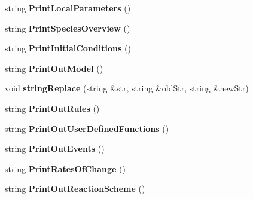 \begin{DoxyCompactItemize}
\item 
\hypertarget{class_matlab_translator_a98f05c4ab394f20d091b35fd7d50cbf0}{string {\bfseries Print\-Local\-Parameters} ()}\label{class_matlab_translator_a98f05c4ab394f20d091b35fd7d50cbf0}

\item 
\hypertarget{class_matlab_translator_a79171b460eefd53ed341f68e376ca261}{string {\bfseries Print\-Species\-Overview} ()}\label{class_matlab_translator_a79171b460eefd53ed341f68e376ca261}

\item 
\hypertarget{class_matlab_translator_ab5db791638a4189ae60f572b7da6cf1d}{string {\bfseries Print\-Initial\-Conditions} ()}\label{class_matlab_translator_ab5db791638a4189ae60f572b7da6cf1d}

\item 
\hypertarget{class_matlab_translator_ad2ef370634359e895aa3b1640a61ac9b}{string {\bfseries Print\-Out\-Model} ()}\label{class_matlab_translator_ad2ef370634359e895aa3b1640a61ac9b}

\item 
\hypertarget{class_matlab_translator_a7ed4fdf19fade3182a09209be4528ac4}{void {\bfseries string\-Replace} (string \&str, string \&old\-Str, string \&new\-Str)}\label{class_matlab_translator_a7ed4fdf19fade3182a09209be4528ac4}

\item 
\hypertarget{class_matlab_translator_a8dcc4de45d0a918816ec6a140673bed6}{string {\bfseries Print\-Out\-Rules} ()}\label{class_matlab_translator_a8dcc4de45d0a918816ec6a140673bed6}

\item 
\hypertarget{class_matlab_translator_a29aaa503cf05940ae7a2b79ba2fc568d}{string {\bfseries Print\-Out\-User\-Defined\-Functions} ()}\label{class_matlab_translator_a29aaa503cf05940ae7a2b79ba2fc568d}

\item 
\hypertarget{class_matlab_translator_a2f7ce8fcd43f095a99fc8d404f244180}{string {\bfseries Print\-Out\-Events} ()}\label{class_matlab_translator_a2f7ce8fcd43f095a99fc8d404f244180}

\item 
\hypertarget{class_matlab_translator_a25ddbe94f807caf935e176e8d7868aa9}{string {\bfseries Print\-Rates\-Of\-Change} ()}\label{class_matlab_translator_a25ddbe94f807caf935e176e8d7868aa9}

\item 
\hypertarget{class_matlab_translator_ac72d6e4ccbf85849949ae62b44212dd3}{string {\bfseries Print\-Out\-Reaction\-Scheme} ()}\label{class_matlab_translator_ac72d6e4ccbf85849949ae62b44212dd3}


\end{DoxyCompactItemize}
